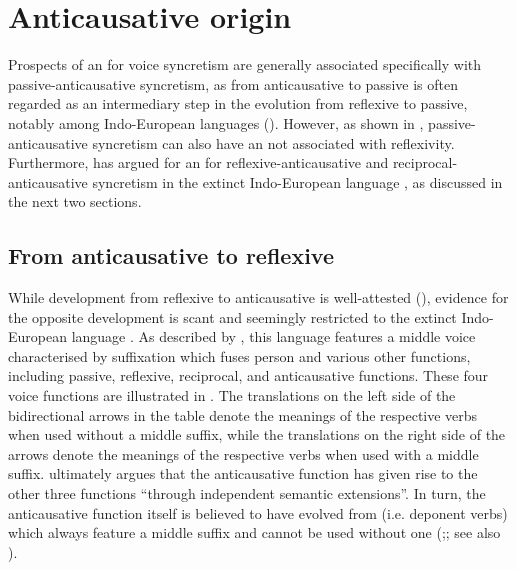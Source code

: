 \section{Anticausative origin} \label{diachrony:anticausative}
Prospects of an  for voice syncretism are generally associated specifically with passive-anticausative syncretism, as  from anticausative to passive is often regarded as an intermediary step in the evolution from reflexive to passive, notably among Indo-European languages (). However, as shown in , passive-anticausative syncretism can also have an  not associated with reflexivity. Furthermore, \citet{inglese:2020} has argued for an  for reflexive-anticausative and reciprocal-anticausative syncretism in the extinct Indo-European language , as discussed in the next two sections. 

\subsection{From anticausative to reflexive} \label{diachrony:antc2refl}
While development from reflexive to anticausative is well-attested (), evidence for the opposite development is scant and seemingly restricted to the extinct Indo-European language . As described by \citet{inglese:2020}, this language features a middle voice characterised by suffixation which fuses person  and various other functions, including passive, reflexive, reciprocal, and anticausative functions. These four voice functions are illustrated in . The translations on the left side of the bidirectional arrows in the table denote the meanings of the respective verbs when used without a middle suffix, while the translations on the right side of the arrows denote the meanings of the respective verbs when used with a middle suffix. \citet[240]{inglese:2020} ultimately argues that the anticausative function has given rise to the other three functions “through independent semantic extensions”. In turn, the anticausative function itself is believed to have evolved from  (i.e. deponent verbs) which always feature a middle suffix and cannot be used without one (\citealt[241ff.]{inglese:2020};; see also \citealt{luraghi:2012}).

